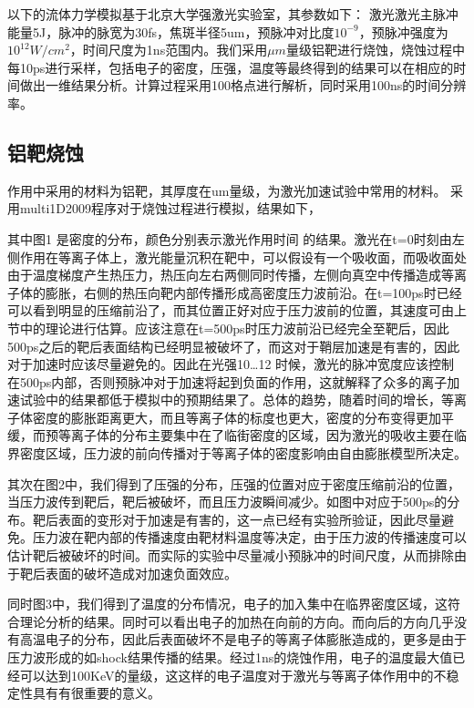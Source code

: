 以下的流体力学模拟基于北京大学强激光实验室，其参数如下：
激光激光主脉冲能量5J，脉冲的脉宽为30fs，焦斑半径5um，预脉冲对比度$10^{-9}$，预脉冲强度为$10^12W/cm^2$，时间尺度为1ns范围内。我们采用$\mu m$量级铝靶进行烧蚀，烧蚀过程中每10ps进行采样，包括电子的密度，压强，温度等最终得到的结果可以在相应的时间做出一维结果分析。计算过程采用100格点进行解析，同时采用100ns的时间分辨率。

\subsection{铝靶烧蚀}

作用中采用的材料为铝靶，其厚度在um量级，为激光加速试验中常用的材料。 采用multi1D2009程序对于烧蚀过程进行模拟，结果如下， 


其中图1 是密度的分布，颜色分别表示激光作用时间 的结果。激光在t=0时刻由左侧作用在等离子体上，激光能量沉积在靶中，可以假设有一个吸收面，而吸收面处由于温度梯度产生热压力，热压向左右两侧同时传播，左侧向真空中传播造成等离子体的膨胀，右侧的热压向靶内部传播形成高密度压力波前沿。在t=100ps时已经可以看到明显的压缩前沿了，而其位置正好对应于压力波前的位置，其速度可由上节中的理论进行估算。应该注意在t=500ps时压力波前沿已经完全至靶后，因此500ps之后的靶后表面结构已经明显被破坏了，而这对于鞘层加速是有害的，因此对于加速时应该尽量避免的。因此在光强10…12 时候，激光的脉冲宽度应该控制在500ps内部，否则预脉冲对于加速将起到负面的作用，这就解释了众多的离子加速试验中的结果都低于模拟中的预期结果了。总体的趋势，随着时间的增长，等离子体密度的膨胀距离更大，而且等离子体的标度也更大，密度的分布变得更加平缓，而预等离子体的分布主要集中在了临街密度的区域，因为激光的吸收主要在临界密度区域，压力波的前向传播对于等离子体的密度影响由自由膨胀模型所决定。




其次在图2中，我们得到了压强的分布，压强的位置对应于密度压缩前沿的位置，当压力波传到靶后，靶后被破坏，而且压力波瞬间减少。如图中对应于500ps的分布。靶后表面的变形对于加速是有害的，这一点已经有实验所验证，因此尽量避免。压力波在靶内部的传播速度由靶材料温度等决定，由于压力波的传播速度可以估计靶后被破坏的时间。而实际的实验中尽量减小预脉冲的时间尺度，从而排除由于靶后表面的破坏造成对加速负面效应。


同时图3中，我们得到了温度的分布情况，电子的加入集中在临界密度区域，这符合理论分析的结果。同时可以看出电子的加热在向前的方向。而向后的方向几乎没有高温电子的分布，因此后表面破坏不是电子的等离子体膨胀造成的，更多是由于压力波形成的如shock结果传播的结果。经过1ns的烧蚀作用，电子的温度最大值已经可以达到100KeV的量级，这这样的电子温度对于激光与等离子体作用中的不稳定性具有有很重要的意义。



